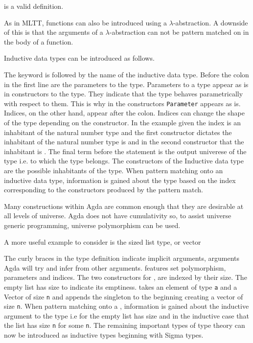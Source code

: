 is a valid definition.

As in MLTT, functions can also be introduced using a $\lambda$-abstraction. A
downside of this is that the arguments of a $\lambda$-abstraction can not be
pattern matched on in the body of a function.


Inductive data types can be introduced as follows.


The  keyword is followed by the name of the inductive data
type. Before the colon in the first line are the parameters to the type.
Parameters to a type appear as is in constructors to the type. They indicate
that the type behaves parametrically with respect to them. This is why in the
constructors \verb|Parameter| appears as is. Indices, on the other hand, appear
after the colon. Indices can change the shape of the type depending on the
constructor. In the example given the index is an inhabitant of the natural
number type and the first constructor dictates the inhabitant of the natural
number type is  and in the second constructor that
the inhabitant is . The final term before the
 statement is the output univerese of the type i.e. to which
 the type belongs. The constructors of the Inductive data type
are the possible inhabitants of the type. When pattern matching onto an
inductive data type, information is gained about the type based on the index
corresponding to the constructors produced by the pattern match.

Many constructions within Agda are common enough that they are desirable at all
levels of universe. Agda does not have cumulativity so, to assist universe
generic programming, universe polymorphism can be used.


A more useful example to consider is the sized list type, or vector


The curly braces in the type definition indicate implicit arguments, arguments
Agda will try and infer from other arguments.  features set
polymorphism, parameters and indices. The two constructors for
, are indexed by their size. The empty list has size
 to indicate its emptiness.
takes an element of type \verb|a| and a Vector of size \verb|n| and appends the
singleton to the beginning creating a vector of size
 \verb|n|. When pattern matching onto a
, information is gained about the inductive argument to the
type i.e for the empty list has size  and in the
inductive case that the list has size  \verb|n|
for some \verb|n|. The remaining important types of \mlt type theory can
now be introduced as inductive types beginning with Sigma types.

